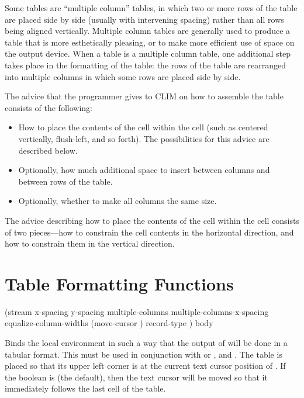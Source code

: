 Some tables are ``multiple column'' tables, in which two or more rows of the
table are placed side by side (usually with intervening spacing) rather than
all rows being aligned vertically.  Multiple column tables are generally used
to produce a table that is more esthetically pleasing, or to make more
efficient use of space on the output device.  When a table is a multiple
column table, one additional step takes place in the formatting of the table:
the rows of the table are rearranged into multiple columns in which some rows
are placed side by side.

The advice that the programmer gives to CLIM on how to assemble the table
consists of the following:
\begin{itemize}
\item How to place the contents of the cell within the cell (such as centered
vertically, flush-left, and so forth). The possibilities for this advice are
described below.

\item Optionally, how much additional space to insert between columns and
between rows of the table.

\item Optionally, whether to make all columns the same size.
\end{itemize}

The advice describing how to place the contents of the cell within the cell
consists of two pieces---how to constrain the cell contents in the horizontal
direction, and how to constrain them in the vertical direction.

\section {Table Formatting Functions}

 {(\optional stream
                               \key x-spacing y-spacing
                                    multiple-columns multiple-columns-x-spacing
                                    equalize-column-widths 
                                    (move-cursor ) record-type \allow)
                              \body body}

Binds the local environment in such a way that the output of  will be done
in a tabular format.  This must be used in conjunction with 
or , and .  The table is placed so
that its upper left corner is at the current text cursor position of
.  If the boolean  is  (the default),
then the text cursor will be moved so that it immediately follows the last cell
of the table.


